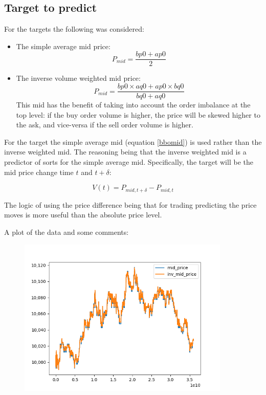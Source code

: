 \documentclass[english, 11pt, a4paper]{article}
\begin{document}
\subsection{Target to predict}
For the targets the following was considered:
\begin{itemize}
    \item The simple average mid price:
        \begin{equation}
            P_{mid} = \frac{bp0 + ap0}{2} \label{bbomid}
        \end{equation}
    \item The inverse volume weighted mid price:
        \begin{equation}
            P_{mid} = \frac{bp0\times aq0 + ap0 \times bq0}{bq0 + aq0}
        \end{equation}
        This mid has the benefit of taking into account the order imbalance at the top level: if
        the buy order volume is higher, the price will be skewed higher to the ask, and vice-versa
        if the sell order volume is higher.
\end{itemize}

For the target the simple average mid (equation \ref{bbomid}) is used rather than the inverse weighted mid. The reasoning
being that the inverse weighted mid is a predictor of sorts for the simple average mid.
Specifically, the target will be the mid price change time $t$ and $t+\delta$:

\begin{equation}
    V(t) = P_{mid, t+\delta} - P_{mid, t}
\end{equation}

The logic of using the price difference being that for trading predicting the price moves is more
useful than the absolute price level.

A plot of the data and some comments:
 \begin{figure}[H] 
	\centering
	\includegraphics[width=0.90\textwidth]{../data/figures/time_series_20190610_mid_price_inv_mid_price.png}
	\caption{}
	\label{fig2}
\end{figure}
\end{document}
